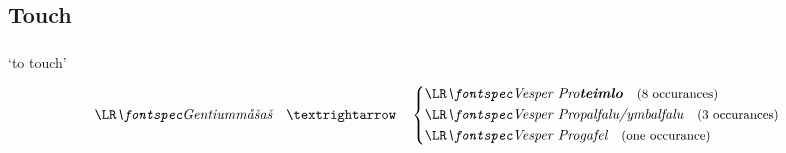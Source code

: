 \subsection{Touch}




\subsubsection{}

\begin{frame}{ ‘to touch’}
	\begin{center}
		$$
		\mtext{\bh{måšaš}} \transto
		\begin{dcases}
			\mtext{\C{\hl{teimlo}}\quad \small (8 occurances)}\\
			\mtext{\C{palfalu/ymbalfalu}\quad \small (3 occurances)}\\
			\mtext{\C{gafel}\quad \small (one occurance)}
		\end{dcases}
		$$
	\end{center}
\end{frame}



\subsubsection{}

\subsubsection{}
